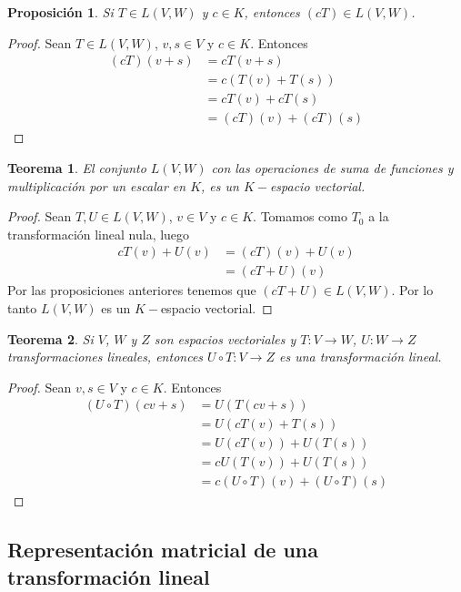 \documentclass{book}
\newtheorem{theorem}{Teorema}
\newtheorem{proposition}{Proposición}
\begin{document}
\begin{proposition}
Si $T\in L(V,W)$ y $c\in K$, entonces $(cT)\in L(V,W)$.
\end{proposition}

\begin{proof}
Sean $T\in L(V,W)$, $v,s\in V$ y $c\in K$. Entonces
\[
\begin{split}
(cT)(v+s) &=cT(v+s) \\
&=c(T(v)+T(s)) \\
&=cT(v)+cT(s) \\
&=(cT)(v)+(cT)(s)
\end{split}
\]
\end{proof}

\begin{theorem}
El conjunto $L(V,W)$ con las operaciones de suma de funciones y multiplicación por un escalar en $K$, es un $K-$espacio vectorial.
\end{theorem}

\begin{proof}
Sean $T,U \in L(V,W)$, $v\in V$ y $c\in K$. Tomamos como $T_0$ a la transformación lineal nula, luego
\[
\begin{split}
cT(v)+U(v) &=(cT)(v)+U(v) \\
&=(cT+U)(v)
\end{split}
\]
Por las proposiciones anteriores tenemos que $(cT+U)\in L(V,W)$. Por lo tanto $L(V,W)$ es un $K-$espacio vectorial.
\end{proof}

\begin{theorem}
Si $V$, $W$ y $Z$ son espacios vectoriales y $T:V \rightarrow W$, $U:W \rightarrow Z$ transformaciones lineales, entonces $U\circ T:V \rightarrow Z$ es una transformación lineal.
\end{theorem}

\begin{proof}
Sean $v,s\in V$ y $c\in K$. Entonces
\[
\begin{split}
(U\circ T)(cv+s) &=U(T(cv+s)) \\
&=U(cT(v)+T(s)) \\
&=U(cT(v))+U(T(s)) \\
&=cU(T(v))+U(T(s)) \\
&=c(U \circ T)(v)+(U\circ T)(s)
\end{split}
\]
\end{proof}

\subsection{Representación matricial de una transformación lineal}
\end{document}
